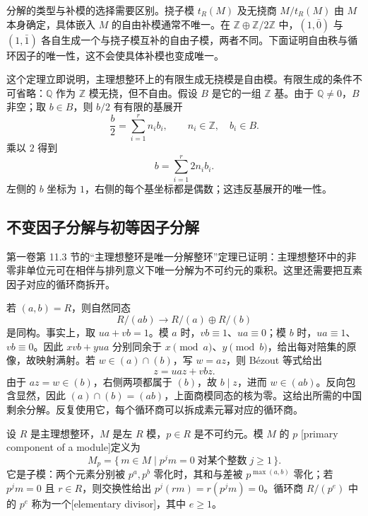 分解的类型与补模的选择需要区别。挠子模 \(t_R(M)\) 及无挠商 \(M/t_R(M)\) 由 \(M\) 本身确定，具体嵌入 \(M\) 的自由补模通常不唯一。在 \(\mathbb Z\oplus\mathbb Z/2\mathbb Z\) 中，\((1,\bar0)\) 与 \((1,\bar1)\) 各自生成一个与挠子模互补的自由子模，两者不同。下面证明自由秩与循环因子的唯一性，这不会使具体补模也变成唯一。

\ProseParagraphBreak
这个定理立即说明，主理想整环上的有限生成无挠模是自由模。有限生成的条件不可省略：\(\mathbb Q\) 作为 \(\mathbb Z\) 模无挠，但不自由。假设 \(B\) 是它的一组 \(\mathbb Z\) 基。由于 \(\mathbb Q\ne0\)，\(B\) 非空；取 \(b\in B\)，则 \(b/2\) 有有限的基展开
\[
	\frac b2=\sum_{i=1}^r n_i b_i,\qquad n_i\in\mathbb Z,\quad b_i\in B.
\]
乘以 \(2\) 得到
\[
	b=\sum_{i=1}^r 2n_i b_i.
\]
左侧的 \(b\) 坐标为 \(1\)，右侧的每个基坐标都是偶数；这违反基展开的唯一性。

\subsection{不变因子分解与初等因子分解}
\label{b2:subsec:0403:02}

第一卷第 11.3 节的“主理想整环是唯一分解整环”定理已证明：主理想整环中的非零非单位元可在相伴与排列意义下唯一分解为不可约元的乘积。这里还需要把互素因子对应的循环商拆开。

\ProseParagraphBreak
若 \((a,b)=R\)，则自然同态
\[
	R/(ab)\longrightarrow R/(a)\oplus R/(b)
\]
是同构。事实上，取 \(ua+vb=1\)。模 \(a\) 时，\(vb\equiv1\)、\(ua\equiv0\)；模 \(b\) 时，\(ua\equiv1\)、\(vb\equiv0\)。因此 \(xvb+yua\) 分别同余于 \(x\pmod a\)、\(y\pmod b\)，给出每对陪集的原像，故映射满射。若 \(w\in(a)\cap(b)\)，写 \(w=az\)，则 Bézout 等式给出
\[
	z=uaz+vbz.
\]
由于 \(az=w\in(b)\)，右侧两项都属于 \((b)\)，故 \(b\mid z\)，进而 \(w\in(ab)\)。反向包含显然，因此 \((a)\cap(b)=(ab)\)，上面商模同态的核为零。这给出所需的中国剩余分解。反复使用它，每个循环商可以拆成素元幂对应的循环商。

\begin{definition}\label{b2:def:pid-primary-module}
	设 \(R\) 是主理想整环，\(M\) 是左 \(R\) 模，\(p\in R\) 是不可约元。模 \(M\) 的 \(p\) [primary component of a module]定义为
	\[
		M_p=\{\,m\in M\mid p^jm=0\;\text{对某个整数}\;j\ge1\,\}.
	\]
	它是子模：两个元素分别被 \(p^a,p^b\) 零化时，其和与差被 \(p^{\max(a,b)}\) 零化；若 \(p^jm=0\) 且 \(r\in R\)，则交换性给出 \(p^j(rm)=r(p^jm)=0\)。循环商 \(R/(p^e)\) 中的 \(p^e\) 称为一个[elementary divisor]，其中 \(e\ge1\)。
\end{definition}

